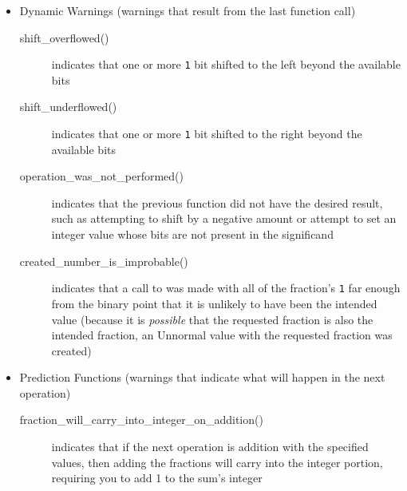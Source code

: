 \begin{itemize}
    \item Dynamic Warnings (warnings that result from the last function call)
    \begin{description}
        \item[shift\_overflowed()] indicates that one or more \lstinline{1} bit shifted to the left beyond the available bits
        \item[shift\_underflowed()] indicates that one or more \lstinline{1} bit shifted to the right beyond the available bits
        \item[operation\_was\_not\_performed()] indicates that the previous function did not have the desired result, such as attempting to shift by a negative amount or attempt to set an integer value whose bits are not present in the significand
        \item[created\_number\_is\_improbable()] indicates that a call to  was made with all of the fraction's \lstinline{1} far enough from the binary point that it is unlikely to have been the intended value (because it is \textit{possible} that the requested fraction is also the intended fraction, an Unnormal value with the requested fraction was created)
    \end{description}
    \item Prediction Functions (warnings that indicate what will happen in the next operation)
    \begin{description}
        \item[fraction\_will\_carry\_into\_integer\_on\_addition()] indicates that if the next operation is addition with the specified values, then adding the fractions will carry into the integer portion, requiring you to add 1 to the sum's integer

\end{description}
\end{itemize}
